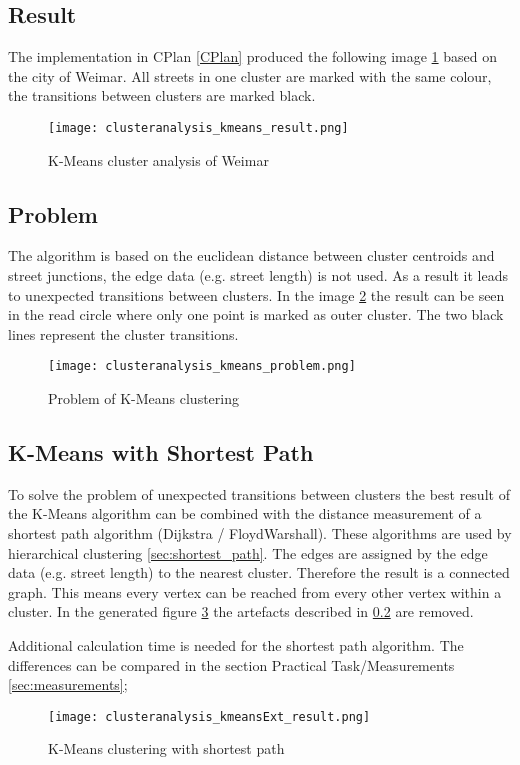\subsection{Result}
The implementation in CPlan \ref{CPlan} produced the following image \ref{fig:KmeansGenerated} based on the city of Weimar. All streets in one cluster are marked with the same colour, the transitions between clusters are marked black.
\begin{figure}[!h]
    \centering
    \texttt{[image: clusteranalysis\_kmeans\_result.png]}
    \caption{K-Means cluster analysis of Weimar\label{fig:KmeansGenerated}}
\end{figure}

\subsection{Problem} \label{kmenasProblem}
The algorithm is based on the euclidean distance between cluster centroids and street junctions, the edge data (e.g. street length) is not used. As a result it leads to unexpected transitions between clusters. In the image \ref{fig:KmeansProblem} the result can be seen in the read circle where only one point is marked as outer cluster. The two black lines represent the cluster transitions.
\begin{figure}[!h]
    \centering
    \texttt{[image: clusteranalysis\_kmeans\_problem.png]}
    \caption{Problem of K-Means clustering\label{fig:KmeansProblem}}
\end{figure}

\subsection{K-Means with Shortest Path} \label{K-Means_shortest_path}
To solve the problem of unexpected transitions between clusters the best result of the K-Means algorithm can be combined with the distance measurement of a shortest path algorithm (Dijkstra / FloydWarshall). These algorithms are used by hierarchical clustering \ref{sec:shortest_path}. The edges are assigned by the edge data (e.g. street length) to the nearest cluster. Therefore the result is a connected graph. This means every vertex can be reached from every other vertex within a cluster. In the generated figure \ref{fig:Kmeansshortestp} the artefacts described in \ref{kmenasProblem} are removed.

Additional calculation time is needed for the shortest path algorithm. The differences can be compared in the section Practical Task/Measurements \ref{sec:measurements};

\begin{figure}[!h]
    \centering
    \texttt{[image: clusteranalysis\_kmeansExt\_result.png]}
    \caption{K-Means clustering with shortest path\label{fig:Kmeansshortestp}}
\end{figure}
